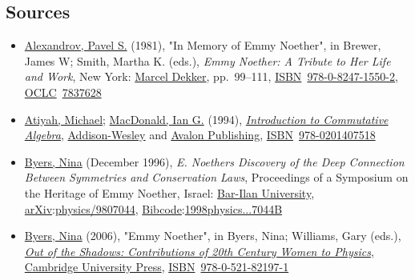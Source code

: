 \subsection{Sources}\label{Sources}


\begin{itemize}
\tightlist
\item
  \href{https://en.wikipedia.org/wiki/Pavel_Alexandrov}{Alexandrov, Pavel S.} (1981), "In Memory of Emmy Noether", in Brewer, James W; Smith, Martha K. (eds.), \emph{Emmy Noether: A Tribute to Her Life and Work}, New York: \href{https://en.wikipedia.org/wiki/Marcel_Dekker}{Marcel Dekker}, pp.{~}{99--}111, \href{https://en.wikipedia.org/wiki/ISBN_(identifier)}{ISBN}{~}\href{https://en.wikipedia.org/wiki/Special:BookSources/978-0-8247-1550-2}{978-0-8247-1550-2}, \href{https://en.wikipedia.org/wiki/OCLC_(identifier)}{OCLC}{~}\href{https://search.worldcat.org/oclc/7837628}{7837628}{}
\item
  \href{https://en.wikipedia.org/wiki/Michael_Atiyah}{Atiyah, Michael}; \href{https://en.wikipedia.org/wiki/Ian_G._Macdonald}{MacDonald, Ian G.} (1994), \href{https://en.wikipedia.org/wiki/Introduction_to_Commutative_Algebra}{\emph{Introduction to Commutative Algebra}}, \href{https://en.wikipedia.org/wiki/Addison-Wesley}{Addison-Wesley} and \href{https://en.wikipedia.org/wiki/Avalon_Publishing}{Avalon Publishing}, \href{https://en.wikipedia.org/wiki/ISBN_(identifier)}{ISBN}{~}\href{https://en.wikipedia.org/wiki/Special:BookSources/978-0201407518}{978-0201407518}{}
\item
  \href{https://en.wikipedia.org/wiki/Nina_Byers}{Byers, Nina} (December 1996), \emph{E. Noether\textquotesingle s Discovery of the Deep Connection Between Symmetries and Conservation Laws}, Proceedings of a Symposium on the Heritage of Emmy Noether, Israel: \href{https://en.wikipedia.org/wiki/Bar-Ilan_University}{Bar-Ilan University}, \href{https://en.wikipedia.org/wiki/ArXiv_(identifier)}{arXiv}:{\href{https://arxiv.org/abs/physics/9807044}{physics/9807044}}, \href{https://en.wikipedia.org/wiki/Bibcode_(identifier)}{Bibcode}:\href{https://ui.adsabs.harvard.edu/abs/1998physics...7044B}{1998physics...7044B}{}
\item
  \href{https://en.wikipedia.org/wiki/Nina_Byers}{Byers, Nina} (2006), "Emmy Noether", in Byers, Nina; Williams, Gary (eds.), {\href{https://archive.org/details/outofshadowscont0000unse}{\emph{Out of the Shadows: Contributions of 20th Century Women to Physics}}}, \href{https://en.wikipedia.org/wiki/Cambridge_University_Press}{Cambridge University Press}, \href{https://en.wikipedia.org/wiki/ISBN_(identifier)}{ISBN}{~}\href{https://en.wikipedia.org/wiki/Special:BookSources/978-0-521-82197-1}{978-0-521-82197-1}{}

\end{itemize}
